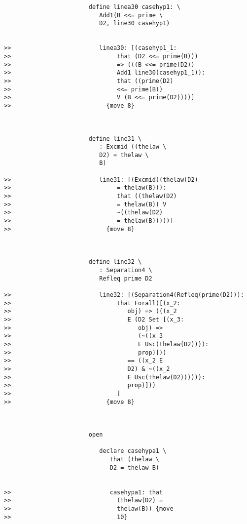 \documentclass[12pt]{article}
\begin{document}
\begin{verbatim}
                        define linea30 casehyp1: \
                           Add1(B <<= prime \
                           D2, line30 casehyp1)


>>                         linea30: [(casehyp1_1:
>>                              that (D2 <<= prime(B)))
>>                              => (((B <<= prime(D2))
>>                              Add1 line30(casehyp1_1)):
>>                              that ((prime(D2)
>>                              <<= prime(B))
>>                              V (B <<= prime(D2))))]
>>                           {move 8}



                        define line31 \
                           : Excmid ((thelaw \
                           D2) = thelaw \
                           B)

>>                         line31: [(Excmid((thelaw(D2)
>>                              = thelaw(B))):
>>                              that ((thelaw(D2)
>>                              = thelaw(B)) V
>>                              ~((thelaw(D2)
>>                              = thelaw(B)))))]
>>                           {move 8}



                        define line32 \
                           : Separation4 \
                           Refleq prime D2

>>                         line32: [(Separation4(Refleq(prime(D2))):
>>                              that Forall([(x_2:
>>                                 obj) => (((x_2
>>                                 E (D2 Set [(x_3:
>>                                    obj) =>
>>                                    (~((x_3
>>                                    E Usc(thelaw(D2)))):
>>                                    prop)]))
>>                                 == ((x_2 E
>>                                 D2) & ~((x_2
>>                                 E Usc(thelaw(D2)))))):
>>                                 prop)]))
>>                              ]
>>                           {move 8}



                        open

                           declare casehypa1 \
                              that (thelaw \
                              D2 = thelaw B)


>>                            casehypa1: that
>>                              (thelaw(D2) =
>>                              thelaw(B)) {move
>>                              10}




\end{verbatim}
\end{document}
